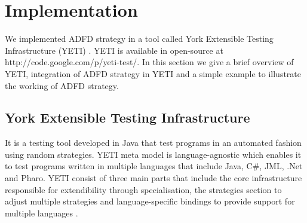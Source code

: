 \documentclass{acm_proc_article-sp}
\begin{document}







\section{Implementation}\label{sec:implementation}
 We implemented ADFD strategy in a tool called York Extensible Testing Infrastructure (YETI) \cite{Oriol2010a}. YETI is available in open-source at http://code.google.com/p/yeti-test/. In this section we give a brief overview of YETI, integration of ADFD strategy in YETI and a simple example to illustrate the working of ADFD strategy.

 \subsection{York Extensible Testing Infrastructure}
 It is a testing tool developed in Java that test programs in an automated fashion using random strategies. YETI meta model is language-agnostic which enables it to test programs written in multiple languages that include Java, C\#, JML, .Net and Pharo. YETI consist of three main parts that include the core infrastructure responsible for extendibility through specialisation, the strategies section to adjust multiple strategies and language-specific bindings to provide support for multiple languages \cite{Oriol2010}. 
 
\end{document}
